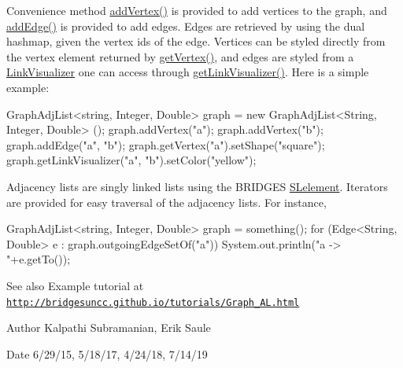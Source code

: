 Convenience method \hyperlink{classbridges_1_1base_1_1_graph_adj_list_aca59a3c40af4ae82716ebbfa1751f267}{add\+Vertex()} is provided to add vertices to the graph, and \hyperlink{classbridges_1_1base_1_1_graph_adj_list_a43041976184920e1db1dbe3ad696c6cd}{add\+Edge()} is provided to add edges. Edges are retrieved by using the dual hashmap, given the vertex ids of the edge. Vertices can be styled directly from the vertex element returned by \hyperlink{classbridges_1_1base_1_1_graph_adj_list_aa19cd300a85b05352bdf58720310a112}{get\+Vertex()}, and edges are styled from a \hyperlink{classbridges_1_1base_1_1_link_visualizer}{Link\+Visualizer} one can access through \hyperlink{classbridges_1_1base_1_1_graph_adj_list_af93888dbd2a768a2401619ad5dc95560}{get\+Link\+Visualizer()}. Here is a simple example\+:


\begin{DoxyCode}
GraphAdjList<string, Integer, Double> graph = \textcolor{keyword}{new} GraphAdjList<String, Integer, Double> ();
graph.addVertex(\textcolor{stringliteral}{"a"});
graph.addVertex(\textcolor{stringliteral}{"b"});
graph.addEdge(\textcolor{stringliteral}{"a"}, \textcolor{stringliteral}{"b"});
graph.getVertex(\textcolor{stringliteral}{"a"}).setShape(\textcolor{stringliteral}{"square"});
graph.getLinkVisualizer(\textcolor{stringliteral}{"a"}, \textcolor{stringliteral}{"b"}).setColor(\textcolor{stringliteral}{"yellow"});
\end{DoxyCode}


Adjacency lists are singly linked lists using the B\+R\+I\+D\+G\+ES \hyperlink{classbridges_1_1base_1_1_s_lelement}{S\+Lelement}. Iterators are provided for easy traversal of the adjacency lists. For instance,


\begin{DoxyCode}
GraphAdjList<string, Integer, Double> graph = something();
\textcolor{keywordflow}{for} (Edge<String, Double> e : graph.outgoingEdgeSetOf(\textcolor{stringliteral}{"a"}))
  System.out.println(\textcolor{stringliteral}{"a -> "}+e.getTo());
\end{DoxyCode}


\begin{DoxySeeAlso}{See also}
Example tutorial at \href{http://bridgesuncc.github.io/tutorials/Graph_AL.html}{\tt http\+://bridgesuncc.\+github.\+io/tutorials/\+Graph\+\_\+\+A\+L.\+html}
\end{DoxySeeAlso}
\begin{DoxyAuthor}{Author}
Kalpathi Subramanian, Erik Saule
\end{DoxyAuthor}
\begin{DoxyDate}{Date}
6/29/15, 5/18/17, 4/24/18, 7/14/19
\end{DoxyDate}

